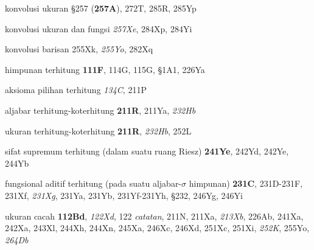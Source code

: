 konvolusi ukuran \S257 ({\bf 257A}), 272T, 285R, 285Yp


konvolusi ukuran dan fungsi {\it 257Xe}, 284Xp, 284Yi


konvolusi barisan 255Xk, {\it 255Yo}, 282Xq








 himpunan terhitung {\bf 111F}, 114G, 115G, \S1A1, 226Ya







aksioma pilihan terhitung {\it 134C}, 211P






aljabar terhitung-koterhitung {\bf 211R}, 211Ya, {\it 232Hb}


ukuran terhitung-koterhitung {\bf 211R}, {\it 232Hb}, 252L






sifat supremum terhitung (dalam suatu ruang Riesz) {\bf 241Ye}, 242Yd, 242Ye, 244Yb




 fungsional aditif terhitung (pada suatu aljabar-$\sigma$ himpunan) {\bf 231C}, 231D-231F, 231Xf, {\it 231Xg}, 231Ya, 231Yb, 231Yf-231Yh, \S232, 246Yg, 246Yi





































 ukuran cacah {\bf 112Bd}, {\it 122Xd}, 122 {\it catatan}, 211N, 211Xa, {\it 213Xb}, 226Ab, 241Xa, 242Xa, 243Xl, 244Xh, 244Xn, 245Xa, 246Xc, 246Xd, 251Xc, 251Xi, {\it 252K}, 255Yo, {\it 264Db}
  










